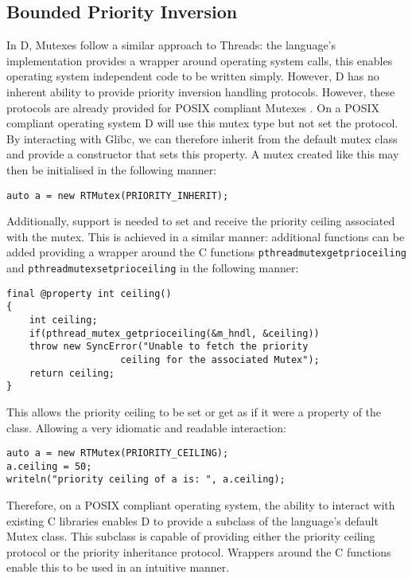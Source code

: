 \subsection{Bounded Priority Inversion}
In D, Mutexes follow a similar approach to Threads: the language's
implementation provides a wrapper around operating system calls, this 
enables operating system independent code to be written simply. However, D has no 
inherent ability to provide priority inversion handling protocols. 
However, these protocols are already provided for POSIX compliant Mutexes 
\cite{mutex-setprotocol}. On a POSIX 
compliant operating system D will use this mutex type but not set the protocol. 
By interacting with Glibc, we can therefore inherit from the default mutex class 
and provide a constructor that sets this property.
A mutex created like this may then be initialised in the following manner: 
\begin{lstlisting}
auto a = new RTMutex(PRIORITY_INHERIT);
\end{lstlisting}
Additionally, support is needed to set and receive the priority ceiling 
associated with the mutex. This is achieved in a similar manner: additional 
functions can be added providing a wrapper around the C functions 
\texttt{pthread\textunderscore{}mutex\textunderscore{}getprioceiling} and 
\texttt{pthread\textunderscore{}mutex\textunderscore{}setprioceiling}
in the following manner:
\begin{lstlisting}
final @property int ceiling()
{
    int ceiling; 
    if(pthread_mutex_getprioceiling(&m_hndl, &ceiling))
    throw new SyncError("Unable to fetch the priority 
                    ceiling for the associated Mutex"); 
    return ceiling; 
}
\end{lstlisting}
This allows the priority ceiling to be set or get as if it were a property of 
the class. Allowing a very idiomatic and readable interaction: 
\begin{lstlisting}
auto a = new RTMutex(PRIORITY_CEILING); 
a.ceiling = 50; 
writeln("priority ceiling of a is: ", a.ceiling); 
\end{lstlisting}
Therefore, on a POSIX compliant operating system, the ability to interact with 
existing C libraries enables D to provide a subclass of the language's default 
Mutex class. This subclass is capable of providing either the priority ceiling 
protocol or the priority inheritance protocol. Wrappers around the C functions 
enable this to be used in an intuitive manner. 

